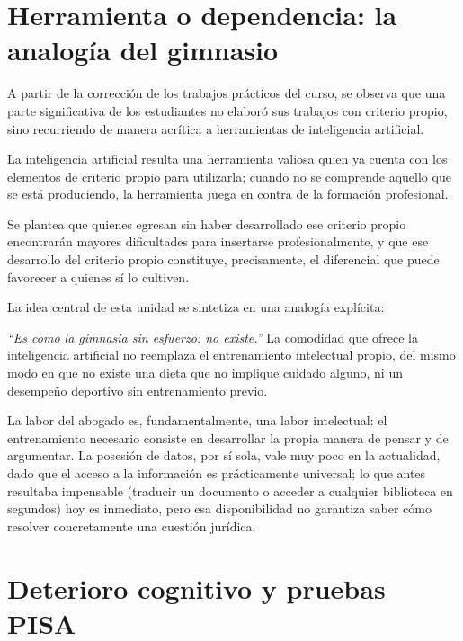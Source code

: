 \documentclass[12pt,oneside]{book}
\begin{document}
\section{Herramienta o dependencia: la analogía del gimnasio}

A partir de la corrección de los trabajos prácticos del curso, se observa que una parte significativa de los estudiantes no elaboró sus trabajos con criterio propio, sino recurriendo de manera acrítica a herramientas de inteligencia artificial.

\begin{important}
La inteligencia artificial resulta una herramienta valiosa quien ya cuenta con los elementos de criterio propio para utilizarla; cuando no se comprende aquello que se está produciendo, la herramienta juega en contra de la formación profesional.
\end{important}

Se plantea que quienes egresan sin haber desarrollado ese criterio propio encontrarán mayores dificultades para insertarse profesionalmente, y que ese desarrollo del criterio propio constituye, precisamente, el diferencial que puede favorecer a quienes sí lo cultiven.

La idea central de esta unidad se sintetiza en una analogía explícita:

\begin{important}
\textit{``Es como la gimnasia sin esfuerzo: no existe.''} La comodidad que ofrece la inteligencia artificial no reemplaza el entrenamiento intelectual propio, del mismo modo en que no existe una dieta que no implique cuidado alguno, ni un desempeño deportivo sin entrenamiento previo.
\end{important}

\begin{important}
La labor del abogado es, fundamentalmente, una labor intelectual: el entrenamiento necesario consiste en desarrollar la propia manera de pensar y de argumentar. La posesión de datos, por sí sola, vale muy poco en la actualidad, dado que el acceso a la información es prácticamente universal; lo que antes resultaba impensable (traducir un documento o acceder a cualquier biblioteca en segundos) hoy es inmediato, pero esa disponibilidad no garantiza saber cómo resolver concretamente una cuestión jurídica.
\end{important}

\section{Deterioro cognitivo y pruebas PISA}
\end{document}
